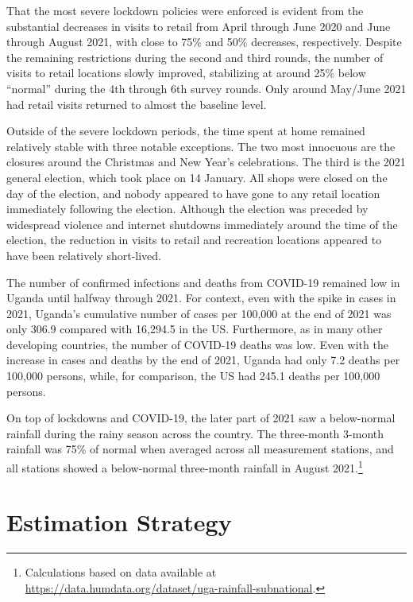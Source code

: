 \documentclass{wber}
\begin{document}
That the most severe lockdown policies were enforced is evident from the
substantial decreases in visits to retail from April through June 2020
and June through August 2021, with close to 75\% and 50\% decreases,
respectively. Despite the remaining restrictions during the second and
third rounds, the number of visits to retail locations slowly improved,
stabilizing at around 25\% below ``normal'' during the 4th through 6th
survey rounds. Only around May/June 2021 had retail visits returned to
almost the baseline level.

Outside of the severe lockdown periods, the time spent at home remained
relatively stable with three notable exceptions. The two most innocuous
are the closures around the Christmas and New Year's celebrations. The
third is the 2021 general election, which took place on 14 January. All
shops were closed on the day of the election, and nobody appeared to
have gone to any retail location immediately following the election.
Although the election was preceded by widespread violence and internet
shutdowns immediately around the time of the election, the reduction in
visits to retail and recreation locations appeared to have been
relatively short-lived.

The number of confirmed infections and deaths from COVID-19 remained low
in Uganda until halfway through 2021. For context, even with the spike
in cases in 2021, Uganda's cumulative number of cases per 100,000 at the
end of 2021 was only 306.9 compared with 16,294.5 in the US.
Furthermore, as in many other developing countries, the number of
COVID-19 deaths was low. Even with the increase in cases and deaths by
the end of 2021, Uganda had only 7.2 deaths per 100,000 persons, while,
for comparison, the US had 245.1 deaths per 100,000 persons.

On top of lockdowns and COVID-19, the later part of 2021 saw a
below-normal rainfall during the rainy season across the country. The
three-month 3-month rainfall was 75\% of normal when averaged across all
measurement stations, and all stations showed a below-normal three-month
rainfall in August 2021.\footnote{Calculations based on data available
  at
  \href{https://data.humdata.org/dataset/uga-rainfall-subnational}{https://data.humdata.org/dataset/uga-rainfall-subnational}.}

\section{Estimation Strategy}\label{estimation-strategy}
\end{document}
